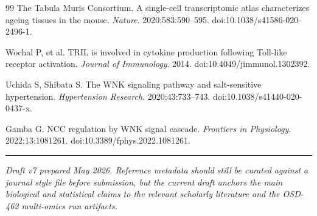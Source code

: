 \documentclass[11pt]{article}
\begin{document}
\begin{thebibliography}{99}
 The Tabula Muris Consortium. A single-cell transcriptomic atlas characterizes ageing tissues in the mouse. \emph{Nature}. 2020;583:590--595. doi:10.1038/s41586-020-2496-1.

 Wochal P, et al. TRIL is involved in cytokine production following Toll-like receptor activation. \emph{Journal of Immunology}. 2014. doi:10.4049/jimmunol.1302392.

 Uchida S, Shibata S. The WNK signaling pathway and salt-sensitive hypertension. \emph{Hypertension Research}. 2020;43:733--743. doi:10.1038/s41440-020-0437-x.

 Gamba G. NCC regulation by WNK signal cascade. \emph{Frontiers in Physiology}. 2022;13:1081261. doi:10.3389/fphys.2022.1081261.

\end{thebibliography}

\vspace{1em}
\begin{center}
\rule{0.4\textwidth}{0.4pt}
\end{center}
\vspace{0.3em}
\noindent\textit{Draft v7 prepared May 2026. Reference metadata should still be curated against a journal style file before submission, but the current draft anchors the main biological and statistical claims to the relevant scholarly literature and the OSD-462 multi-omics run artifacts.}
\end{document}
